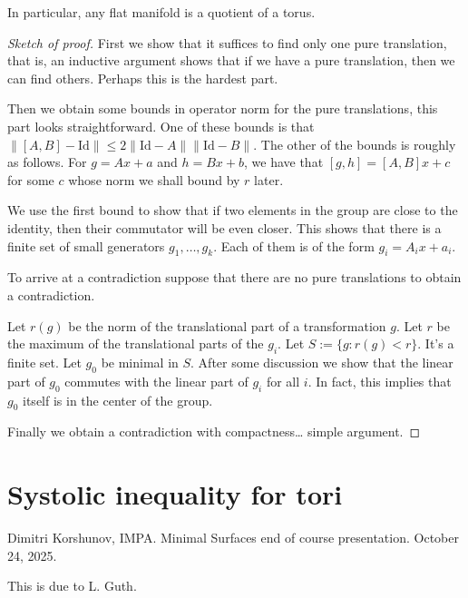 \begin{theorem}[Bieberbach]
\label{theorem-Bieberbach}
In particular, any flat manifold is a
quotient of a torus.
\end{theorem}

\begin{proof}[Sketch of proof]
First we show that it suffices to find only
one pure translation, that is, an
inductive argument shows that if we have a
pure translation, then we can find
others. Perhaps this is the hardest part.

Then we obtain some bounds in operator norm
for the pure translations, this part
looks straightforward.  One of these bounds
is that $\|[A,B]-\text{Id}\|\leq
2\|\text{Id}-A\|\|\text{Id}-B\|$. The other
of the bounds is roughly as follows.
For $g=Ax+a$ and $h=Bx+b$, we have that
$[g,h]=[A,B]x+c$ for some $c$ whose norm
we shall bound by $r$ later.

We use the first bound to show that if two
elements in the group are close to
the identity, then their commutator will be
even closer. This shows that there
is a finite set of small generators
$g_1,\ldots,g_k$. Each of them is of the
form $g_i=A_ix+a_i$.

To arrive at a contradiction suppose that
there are no pure translations to
obtain a contradiction.

Let $r(g)$ be the norm of the translational
part of a transformation $g$. Let
$r$ be the maximum of the translational parts
of the $g_i$.
Let $S:=\{g:r(g)<r\}$. It's a finite set. Let
$g_0$ be minimal in $S$. After
some discussion we show that the linear part
of $g_0$ commutes with the linear
part of $g_i$ for all $i$. In fact, this
implies that $g_0$ itself is in the
center of the group.

Finally we obtain a contradiction with
compactness… simple argument.
\end{proof}


\section{Systolic inequality for tori}
\label{section-systolic-inequality}

\noindent
Dimitri Korshunov, IMPA.
Minimal Surfaces end of course presentation.
October 24, 2025.

\medskip\noindent
This is due to L. Guth.


